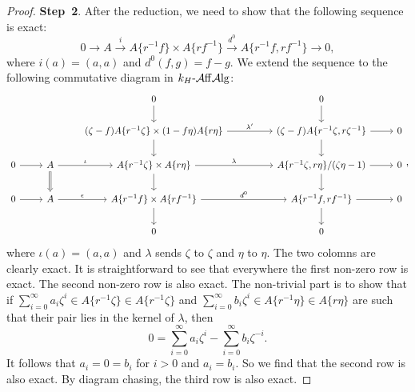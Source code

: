 \begin{proof}
    \textbf{Step~2}. After the reduction, we need to show that the following sequence is exact:
    \[
        0\rightarrow A\xrightarrow{i} A\{r^{-1}f\}\times A\{rf^{-1}\}\xrightarrow{d^0} A\{r^{-1}f,rf^{-1}\}\rightarrow 0,
    \]
    where $i(a)=(a,a)$ and $d^0(f,g)=f-g$. We extend the sequence to the following commutative diagram in $k_H\text{-}\mathcal{A}\mathrm{ff}\mathcal{A}\mathrm{lg}$:
    \[
        \begin{tikzcd}
            &                                                     & 0 \arrow[d]                                                                          &  & 0 \arrow[d]                                                 &   \\
            &                                                     & (\zeta-f)A\{r^{-1}\zeta\}\times (1-f\eta)A\{r\eta\} \arrow[rr, "\lambda'"] \arrow[d] &  & {(\zeta-f)A\{r^{-1}\zeta,r\zeta^{-1}\}} \arrow[r] \arrow[d] & 0 \\
0 \arrow[r] & A \arrow[r, "\iota"] \arrow[d, no head, Rightarrow] & A\{r^{-1}\zeta\}\times A\{r\eta\} \arrow[rr, "\lambda"] \arrow[d]                    &  & {A\{r^{-1}\zeta,r\eta\}/(\zeta\eta-1)} \arrow[r] \arrow[d]  & 0 \\
0 \arrow[r] & A \arrow[r, "\epsilon"]                             & A\{r^{-1}f\}\times A\{rf^{-1}\} \arrow[rr, "d^0"] \arrow[d]                          &  & {A\{r^{-1}f,rf^{-1}\}} \arrow[r] \arrow[d]                  & 0 \\
            &                                                     & 0                                                                                    &  & 0                                                           &  
\end{tikzcd},
    \]
where $\iota(a)=(a,a)$ and $\lambda$ sends $\zeta$ to $\zeta$ and $\eta$ to $\eta$. The two colomns are clearly exact. It is straightforward to see that everywhere the first non-zero row is exact. The second non-zero row is also exact. The non-trivial part is to show that if $\sum_{i=0}^{\infty}a_i \zeta^i\in A\{r^{-1}\zeta\}\in A\{r^{-1}\zeta\}$ and $\sum_{i=0}^{\infty}b_i \zeta^i\in A\{r^{-1}\eta\}\in A\{r\eta\}$ are such that their pair lies in the kernel of $\lambda$, then
\[
    0=\sum_{i=0}^{\infty}a_i\zeta^i-\sum_{i=0}^{\infty}b_i\zeta^{-i}.
\]
It follows that $a_i=0=b_i$ for $i>0$ and $a_i=b_i$. So we find that the second row is also exact. By diagram chasing, the third row is also exact.
\end{proof}



